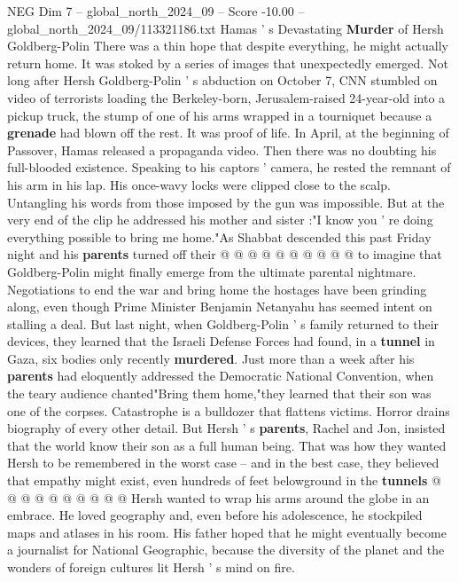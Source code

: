 \begin{textsample}{NEG Dim 7 – global\_north\_2024\_09 – Score -10.00 – global\_north\_2024\_09/113321186.txt}  \label{ex:f7_neg_020}
Hamas ' s Devastating \textbf{Murder} of Hersh Goldberg-Polin There was a thin hope that despite everything, he might actually return home.
It was stoked by a series of images that unexpectedly emerged.
Not long after Hersh Goldberg-Polin ' s abduction on October 7, CNN stumbled on video of terrorists loading the Berkeley-born, Jerusalem-raised 24-year-old into a pickup truck, the stump of one of his arms wrapped in a tourniquet because a \textbf{grenade} had blown off the rest.
It was proof of life.
In April, at the beginning of Passover, Hamas released a propaganda video.
Then there was no doubting his full-blooded existence.
Speaking to his captors ' camera, he rested the remnant of his arm in his lap.
His once-wavy locks were clipped close to the scalp.
Untangling his words from those imposed by the gun was impossible.
But at the very end of the clip he addressed his mother and sister :"I know you ' re doing everything possible to bring me home."As Shabbat descended this past Friday night and his \textbf{parents} turned off their @ @ @ @ @ @ @ @ @ @ to imagine that Goldberg-Polin might finally emerge from the ultimate parental nightmare.
Negotiations to end the war and bring home the hostages have been grinding along, even though Prime Minister Benjamin Netanyahu has seemed intent on stalling a deal.
But last night, when Goldberg-Polin ' s family returned to their devices, they learned that the Israeli Defense Forces had found, in a \textbf{tunnel} in Gaza, six bodies only recently \textbf{murdered}.
Just more than a week after his \textbf{parents} had eloquently addressed the Democratic National Convention, when the teary audience chanted"Bring them home,"they learned that their son was one of the corpses.
Catastrophe is a bulldozer that flattens victims.
Horror drains biography of every other detail.
But Hersh ' s \textbf{parents}, Rachel and Jon, insisted that the world know their son as a full human being.
That was how they wanted Hersh to be remembered in the worst case -- and in the best case, they believed that empathy might exist, even hundreds of feet belowground in the \textbf{tunnels} @ @ @ @ @ @ @ @ @ @ Hersh wanted to wrap his arms around the globe in an embrace.
He loved geography and, even before his adolescence, he stockpiled maps and atlases in his room.
His father hoped that he might eventually become a journalist for National Geographic, because the diversity of the planet and the wonders of foreign cultures lit Hersh ' s mind on fire.

\end{textsample}
